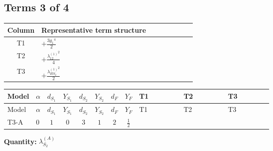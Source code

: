 \documentclass[8pt]{article}
\begin{document}
\begin{landscape}
\subsection*{Terms 3 of 4}
\begin{center}
\begin{tabular}{@{}c >{\raggedright\arraybackslash}p{0.82\linewidth}@{}}
\toprule
Column & Representative term structure \\
\midrule
T1 & \(\displaystyle +\frac{3 {g_1}^4}{2}\) \\
\midrule
T2 & \(\displaystyle +\frac{{\lambda_{12}^{(1)}}^2}{4}\) \\
\midrule
T3 & \(\displaystyle +\frac{{\lambda_{HS_2}^{(1)}}^2}{2}\) \\
\midrule
\bottomrule
\end{tabular}
\end{center}
\smallskip
\tiny
\begin{longtable}{@{}llcccccc >{\raggedright\arraybackslash}p{0.21\linewidth} >{\raggedright\arraybackslash}p{0.21\linewidth} >{\raggedright\arraybackslash}p{0.21\linewidth}@{}}
\toprule
Model & $\alpha$ & $d_{S_1}$ & $Y_{S_1}$ & $d_{S_2}$ & $Y_{S_2}$ & $d_F$ & $Y_F$ & T1 & T2 & T3 \\
\midrule
\endfirsthead
\toprule
Model & $\alpha$ & $d_{S_1}$ & $Y_{S_1}$ & $d_{S_2}$ & $Y_{S_2}$ & $d_F$ & $Y_F$ & T1 & T2 & T3 \\
\midrule
\endhead
T3-A & $0$ & $1$ & $0$ & $3$ & $1$ & $2$ & $\frac{1}{2}$ & \scriptsize\adjustbox{max width=\linewidth}{$\begin{gathered} +\frac{3 {g_1}^4}{2}\end{gathered}$} & \scriptsize\adjustbox{max width=\linewidth}{$\begin{gathered} +\frac{{\lambda_{12}^{(1)}}^2}{4}\end{gathered}$} & \scriptsize\adjustbox{max width=\linewidth}{$\begin{gathered} +\frac{{\lambda_{HS_2}^{(1)}}^2}{2}\end{gathered}$} \\
\midrule
\bottomrule
\end{longtable}
\clearpage
\noindent\textbf{Quantity: }$\lambda_{S_2}^{(A)}$\par\smallskip

\end{landscape}
\end{document}
